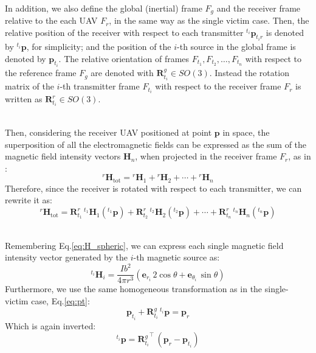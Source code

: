 \documentclass[main]{subfiles}
\begin{document}
\noindent\\
In addition, we also define the global (inertial) frame $F_g$ and the receiver frame relative to the
each UAV $F_r$, in the same way as the single victim case.
Then, the relative position of the receiver with respect to each transmitter 
${}^{t_i} \mathbf{p}_{{t_i}r}$ is denoted by ${}^{t_i} \mathbf{p}$, for simplicity;
and the position of the $i$-th source in the global frame is denoted by 
$\mathbf{p}_{t_i}$.
The relative orientation of frames $F_{t_1}, F_{t_2}, \dots, F_{t_n}$ with respect to 
the reference frame $F_g$ are denoted with $\mathbf{R}^g_{t_i} \in \textit{SO}(3)$.
Instead the rotation matrix of the $i$-th transmitter frame $F_{t_i}$ with respect to the receiver
frame $F_r$ is written as $\mathbf{R}^r_{t_i} \in \textit{SO}(3)$.

\noindent\\
Then, considering the receiver UAV positioned at point $\mathbf{p}$ in space, the superposition
of all the electromagnetic fields can be expressed 
as the sum of the magnetic field intensity vectors \(\mathbf{H}_n\), 
when projected in the receiver frame $F_r$, as in \cite{multiple_spacecraft}:
\begin{equation}
    {}^r \mathbf{H}_{\text{tot}} = 
    {}^r \mathbf{H}_1 + {}^r \mathbf{H}_2 + \cdots + {}^r \mathbf{H}_n 
    \label{eq:sum_H}
\end{equation}
Therefore, since the receiver is rotated with respect to each transmitter, we can rewrite it as:
\begin{equation}
    {}^r \mathbf{H}_{\text{tot}} = 
    \mathbf{R}^r_{t_1} \, {}^{t_1} \mathbf{H}_1({}^{t_1} \mathbf{p}) + \mathbf{R}^r_{t_2} \, {}^{t_2} \mathbf{H}_2({}^{t_2} \mathbf{p}) + \cdots + \mathbf{R}^r_{t_n} \, {}^{t_n} \mathbf{H}_n({}^{t_n} \mathbf{p})
\label{eq:sum_H_rotated}
\end{equation}

\noindent\\
Remembering Eq.\ref{eq:H_spheric}, we can express each single magnetic field intensity vector generated
by the \(i\)-th magnetic source as:
\[
{}^{t_i} \mathbf{H}_i = \frac{I b^2}{4\pi r^3} \left( \mathbf{e}_{r_i} \, 2 \cos \theta + \mathbf{e}_{\theta_i} \, \sin \theta \right)
\]
Furthermore, we use the same homogeneous transformation as in the single-victim case, Eq.\ref{eq:pt}:
\begin{equation}
    \mathbf{p}_{t_i} + \mathbf{R}^g_{t_i} \, {}^{t_i} \mathbf{p} = \mathbf{p}_r
    \label{eq:pt_multi}  
\end{equation}
Which is again inverted:
\begin{equation}
    {}^{t_i} \mathbf{p} = {\mathbf{R}^g_{t_i}}^\top \, \left( \mathbf{p}_r - \mathbf{p}_{t_i} \right)
    \label{eq:pt_transmitter}
\end{equation}
\end{document}
